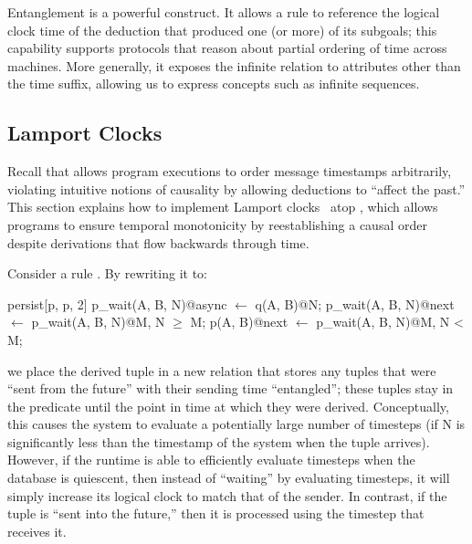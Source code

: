 Entanglement is a powerful construct.  It allows a rule
to reference the logical clock time of the deduction that produced one
(or more) of its subgoals; this capability supports protocols that reason about partial ordering of time across machines.  More generally, it exposes the infinite  relation to attributes other than the time suffix, allowing us to express concepts such as infinite sequences.


\subsection{Lamport Clocks}
\label{sec:lamport}
Recall that \lang allows program executions to order message timestamps arbitrarily, violating intuitive notions of causality by allowing deductions to ``affect the past.''
This section explains how to implement Lamport
clocks~\cite{timeclocks} atop \lang, which allows programs to ensure
temporal monotonicity by reestablishing a causal order
despite derivations that flow backwards through time.

Consider a rule .  By
rewriting it to:

\begin{Dedalus}
persist[p\pos, p\nega, 2]
p\_wait(A, B, N)@async \(\leftarrow\) q(A, B)@N;
p\_wait(A, B, N)@next \(\leftarrow\) p\_wait(A, B, N)@M, N \(\ge\) M;
p(A, B)@next \(\leftarrow\) p\_wait(A, B, N)@M, N < M;
\end{Dedalus}

\noindent
we place the derived tuple in a new relation  that
stores any tuples that were ``sent from the future'' with their sending time ``entangled''; these tuples stay in the  predicate  until the point in
time at which they were derived.  Conceptually, this causes the system
to evaluate a potentially large number of timesteps (if N is
significantly less than the timestamp of the system when the tuple
arrives).  However, if the runtime is able to efficiently evaluate
timesteps when the database is quiescent, then
instead of ``waiting'' by evaluating timesteps, it will simply
increase its logical clock to match that of the sender.  In contrast,
if the tuple is ``sent into the future,'' then it is processed using
the timestep that receives it.

